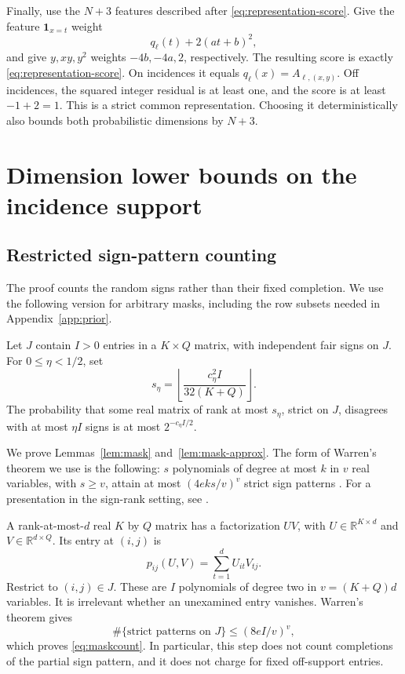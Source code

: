 \documentclass[11pt,letterpaper,pmlr,twoside]{jmlr}
\newcommand{\R}{\mathbb R}
\newcommand{\one}{\mathbf 1}
\begin{document}
Finally, use the $N+3$ features described after \eqref{eq:representation-score}. Give the feature $\one_{x=t}$ weight
\[
 q_\ell(t)+2(at+b)^2,
\]
and give $y,xy,y^2$ weights $-4b,-4a,2$, respectively. The resulting score is exactly \eqref{eq:representation-score}. On incidences it equals $q_\ell(x)=A_{\ell,(x,y)}$. Off incidences, the squared integer residual is at least one, and the score is at least $-1+2=1$. This is a strict common representation. Choosing it deterministically also bounds both probabilistic dimensions by $N+3$.

\section{Dimension lower bounds on the incidence support}
\label{app:counting}
\subsection{Restricted sign-pattern counting}
The proof counts the random signs rather than their fixed completion. We use the following version for arbitrary masks, including the row subsets needed in Appendix~\ref{app:prior}.
\begin{lemma}\label{lem:mask-approx}
Let $J$ contain $I>0$ entries in a $K\times Q$ matrix, with independent fair signs on $J$. For $0\le\eta<1/2$, set
\[
 s_\eta=\left\lfloor\frac{c_\eta^2 I}{32(K+Q)}\right\rfloor.
\]
The probability that some real matrix of rank at most $s_\eta$, strict on $J$, disagrees with at most $\eta I$ signs is at most $2^{-c_\eta I/2}$.
\end{lemma}
We prove Lemmas~\ref{lem:mask} and~\ref{lem:mask-approx}. The form of Warren's theorem we use is the following: $s$ polynomials of degree at most $k$ in $v$ real variables, with $s\ge v$, attain at most $(4eks/v)^v$ strict sign patterns \citep{Warren68}. For a presentation in the sign-rank setting, see \citet{AMY16}.

A rank-at-most-$d$ real $K$ by $Q$ matrix has a factorization $UV$, with $U\in\R^{K\times d}$ and $V\in\R^{d\times Q}$. Its entry at $(i,j)$ is
\[
 p_{ij}(U,V)=\sum_{t=1}^{d}U_{it}V_{tj}.
\]
Restrict to $(i,j)\in J$. These are $I$ polynomials of degree two in $v=(K+Q)d$ variables. It is irrelevant whether an unexamined entry vanishes. Warren's theorem gives
\[
 \#\{\text{strict patterns on }J\}
 \le (8eI/v)^v,
\]
which proves \eqref{eq:maskcount}. In particular, this step does not count completions of the partial sign pattern, and it does not charge for fixed off-support entries.
\end{document}
